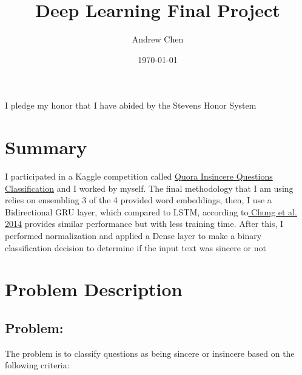 \documentclass[11pt]{article}
\author{Andrew Chen}
\date{\today}
\title{Deep Learning Final Project}
\begin{document}
\maketitle
\begin{center}
I pledge my honor that I have abided by the Stevens Honor System
\end{center}

\section{Summary}
\label{sec:org8c513e8}

I participated in a Kaggle competition called \href{https://www.kaggle.com/c/quora-insincere-questions-classification/overview}{Quora Insincere Questions Classification} and I worked by myself.
The final methodology that I am using relies on ensembling 3 of the 4 provided word embeddings,
then, I use a Bidirectional GRU layer, which compared to LSTM, according to\href{https://arxiv.org/pdf/1412.3555v1.pdf}{ Chung et al. 2014} provides similar performance but with less training time.
After this, I performed normalization and applied a Dense layer to make a binary classification decision to determine if the input text was sincere or not

\section{Problem Description}
\label{sec:orge64b4b0}

\subsection{Problem:}
\label{sec:org024ec8d}

The problem is to classify questions as being sincere or insincere based on the following criteria:
\end{document}
